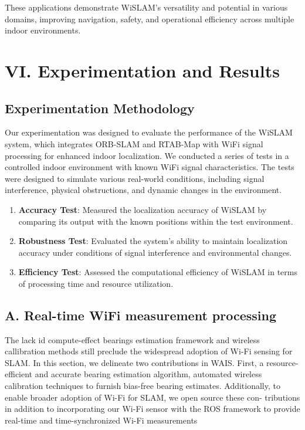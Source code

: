 \documentclass[
	a4paper, %
	11pt, %
	unnumberedsections, %
	twoside, %
]{LTJournalArticle}
\begin{document}
These applications demonstrate WiSLAM's versatility and potential in various domains, improving navigation, safety, and operational efficiency across multiple indoor environments.

\section{VI.	Experimentation and Results}

\subsection{Experimentation Methodology}
Our experimentation was designed to evaluate the performance of the WiSLAM system, which integrates ORB-SLAM and RTAB-Map with WiFi signal processing for enhanced indoor localization. We conducted a series of tests in a controlled indoor environment with known WiFi signal characteristics. The tests were designed to simulate various real-world conditions, including signal interference, physical obstructions, and dynamic changes in the environment.


\begin{enumerate}
	\item \textbf{Accuracy Test}: Measured the localization accuracy of WiSLAM by comparing its output with the known positions within the test environment.
	\item \textbf{Robustness Test}: Evaluated the system's ability to maintain localization accuracy under conditions of signal interference and environmental changes.
	\item \textbf{Efficiency Test}: Assessed the computational efficiency of WiSLAM in terms of processing time and resource utilization.
\end{enumerate}

\subsection{A.	Real-time WiFi measurement processing}
The lack id compute-effect bearings estimation framework and wireless callibration methods still preclude the widespread adoption of Wi-Fi sensing for SLAM. In this section, we delineate two contributions in WAIS. First, a resource-efficient and accurate bearing estimation algorithm, automated wireless calibration techniques to furnish bias-free bearing estimates. Additionally, to enable broader adoption of Wi-Fi for SLAM, we open source these con- tributions in addition to incorporating our Wi-Fi sensor with the ROS framework to provide real-time and time-synchronized Wi-Fi measurements
\end{document}
